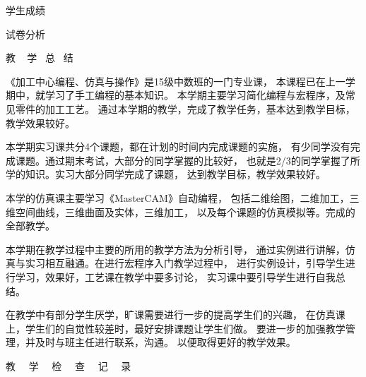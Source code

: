 \documentclass[UTF8,zihao = -4]{ctexart}
\begin{document}


学生成绩
试卷分析
\newpage
{}
\renewcommand{\baselinestretch}{1.3}
{
\begin{center}
	\huge \heiti 教 ~ 学  ~总  ~结
\end{center}

 \large  \setlength{\parindent}{2em} 
 
《加工中心编程、仿真与操作》是15级中数班的一门专业课，
 本课程已在上一学期中，就学习了手工编程的基本知识。
 本学期主要学习简化编程与宏程序，及常见零件的加工工艺。
 通过本学期的教学，完成了教学任务，基本达到教学目标，教学效果较好。

本学期实习课共分4个课题，都在计划的时间内完成课题的实施，
有少同学没有完成课题。通过期末考试，大部分的同学掌握的比较好，
也就是2/3的同学掌握了所学的知识。实习大部分同学完成了课题，
达到教学目标，教学效果较好。

本学的仿真课主要学习《MasterCAM》自动编程，
包括二维绘图，二维加工，三维空间曲线，三维曲面及实体，三维加工，
以及每个课题的仿真模拟等。完成的全部教学。

本学期在教学过程中主要的所用的教学方法为分析引导，
通过实例进行讲解，仿真与实习相互融通。在进行宏程序入门教学过程中，
进行实例设计，引导学生进行学习，效果好，工艺课在教学中要多讨论，
实习课中要引导学生进行自我总结。

在教学中有部分学生厌学，旷课需要进行一步的提高学生们的兴趣，
在仿真课上，学生们的自觉性较差时，最好安排课题让学生们做。
要进一步的加强教学管理，并及时与班主任进行联系，沟通。
以便取得更好的教学效果。
%
%
%
\newpage
{}
\pagestyle{empty}
\begin{center}
	\huge \heiti 教 ~~学 ~~检 ~~查 ~~记~~ 录
	

\end{center}}
\end{document}
